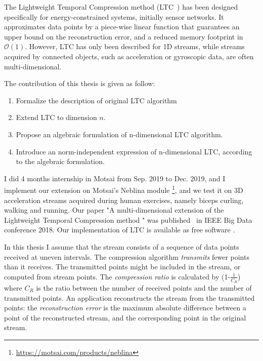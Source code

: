 


The Lightweight Temporal Compression method 
(LTC~\cite{schoellhammer2004lightweight}) has been designed 
specifically for energy-constrained systems, initially sensor networks. 
It approximates data points by a piece-wise linear function that 
guarantees an upper bound on the reconstruction error, and a reduced 
memory footprint in $\mathcal{O}(1)$. However, LTC has only been 
described for 1D streams, while streams acquired by connected objects, such as 
acceleration or gyroscopic data, are often multi-dimensional. 



The contribution of this thesis is given as follow:
\begin{enumerate}
  \item Formalize the description of original LTC algorithm
  \item Extend LTC to dimension $n$.
  \item Propose an algebraic formulation of n-dimensional LTC algorithm.
  \item Introduce an norm-independent expression of n-dimensional LTC, according to
  the algebraic formulation.
\end{enumerate}


I did 4 months internship in Motsai from Sep. 2019 to Dec. 2019, and I implement
our extension on  Motsai's Neblina module
\footnote{\url{https://motsai.com/products/neblina}}, and we test it on 3D
acceleration streams acquired during human exercises, namely biceps curling,
walking and  running. Our paper "A multi-dimensional extension of the
Lightweight Temporal Compression method " was published~\cite{li2018multi} in
IEEE Big Data conference 2018. Our implementation of LTC is available as free
software .



In this thesis I assume that the stream consists of a sequence of data points
received at uneven intervals. The compression algorithm  \emph{transmits} fewer
points than it receives. The transmitted points  might be included in the
stream, or computed from stream points. The  \emph{compression ratio} is
calculated by (1-$\frac{1}{C_R}$) where $C_R$ is the ratio between the number of
received points and the number of transmitted points. An application
reconstructs the stream from the transmitted points: the  \emph{reconstruction
error} is the maximum absolute difference between  a point of the reconstructed
stream, and the corresponding  point in the original stream.


